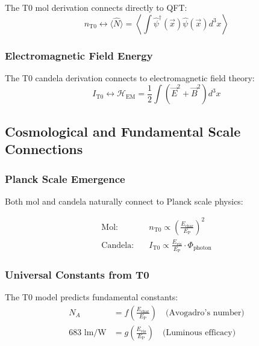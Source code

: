 \documentclass[12pt,a4paper]{article}
\newcommand{\EP}{E_{\text{P}}}
\newcommand{\Echar}{E_{\text{char}}}
\newcommand{\Evis}{E_{\text{vis}}}
\newcommand{\Phiphoton}{\Phi_{\text{photon}}}
\begin{document}
The T0 mol derivation connects directly to QFT:
\begin{equation}
	n_{\text{T0}} \leftrightarrow \langle \hat{N} \rangle = \left\langle \int \hat{\psi}^\dagger(\vec{x}) \hat{\psi}(\vec{x}) d^3x \right\rangle
	\label{eq:mol_qft_connection}
\end{equation}

\subsubsection{Electromagnetic Field Energy}
\label{subsubsec:em_field_energy}

The T0 candela derivation connects to electromagnetic field theory:
\begin{equation}
	I_{\text{T0}} \leftrightarrow \mathcal{H}_{\text{EM}} = \frac{1}{2}\int (\vec{E}^2 + \vec{B}^2) d^3x
	\label{eq:candela_em_connection}
\end{equation}

\subsection{Cosmological and Fundamental Scale Connections}
\label{subsec:cosmological_connections}

\subsubsection{Planck Scale Emergence}
\label{subsubsec:planck_scale_emergence}

Both mol and candela naturally connect to Planck scale physics:

\begin{align}
	\text{Mol:} \quad &n_{\text{T0}} \propto \left(\frac{\Echar}{\EP}\right)^2 \\
	\text{Candela:} \quad &I_{\text{T0}} \propto \frac{\Evis}{\EP} \cdot \Phiphoton
\end{align}

\subsubsection{Universal Constants from T0}
\label{subsubsec:universal_constants_t0}

The T0 model predicts fundamental constants:
\begin{align}
	N_A &= f\left(\frac{\Echar}{\EP}\right) \quad \text{(Avogadro's number)} \\
	683 \text{ lm/W} &= g\left(\frac{\Evis}{\EP}\right) \quad \text{(Luminous efficacy)}
\end{align}
\end{document}
